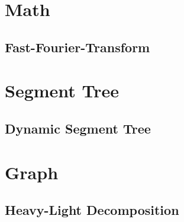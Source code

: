 \documentclass[10pt,landscape,a4paper,twocolumn]{article}
\begin{document}
\section{Math}

\subsection{Fast-Fourier-Transform}


\section{Segment Tree}

\subsection{Dynamic Segment Tree}


\section{Graph}

\subsection{Heavy-Light Decomposition}

\end{document}
